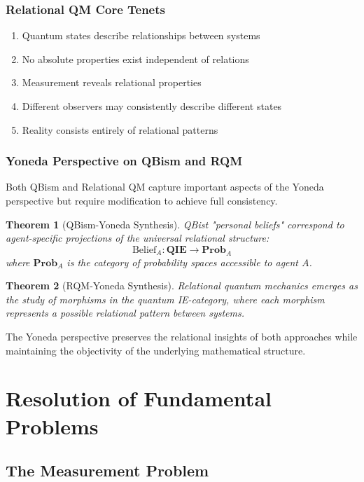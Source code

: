 \documentclass[12pt,a4paper]{article}
\newtheorem{theorem}{Theorem}[section]
\begin{document}
\subsubsection{Relational QM Core Tenets}
\begin{enumerate}
\item Quantum states describe relationships between systems
\item No absolute properties exist independent of relations
\item Measurement reveals relational properties
\item Different observers may consistently describe different states
\item Reality consists entirely of relational patterns
\end{enumerate}

\subsubsection{Yoneda Perspective on QBism and RQM}

Both QBism and Relational QM capture important aspects of the Yoneda perspective but require modification to achieve full consistency.

\begin{theorem}[QBism-Yoneda Synthesis]
QBist "personal beliefs" correspond to agent-specific projections of the universal relational structure:
\[
\text{Belief}_A: \mathbf{QIE} \to \mathbf{Prob}_A
\]
where $\mathbf{Prob}_A$ is the category of probability spaces accessible to agent $A$.
\end{theorem}

\begin{theorem}[RQM-Yoneda Synthesis]
Relational quantum mechanics emerges as the study of morphisms in the quantum IE-category, where each morphism represents a possible relational pattern between systems.
\end{theorem}

The Yoneda perspective preserves the relational insights of both approaches while maintaining the objectivity of the underlying mathematical structure.

\section{Resolution of Fundamental Problems}

\subsection{The Measurement Problem}
\end{document}
